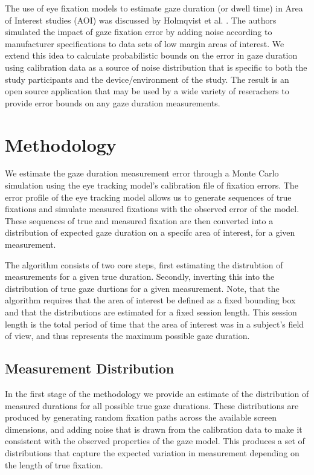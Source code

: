 \documentclass[12pt,a4paper]{article}
\numberwithin{equation}{section}
\begin{document}
The use of eye fixation models to estimate gaze duration (or dwell time) in Area of
Interest studies (AOI) was discussed by Holmqvist et al. \cite{Holmqvist2012}. The
authors simulated the impact of gaze fixation error by adding noise according to
manufacturer specifications to data sets of low margin areas of interest. We extend 
this idea to calculate probabilistic bounds on the error in gaze duration using
calibration data as a source of noise distribution that is specific to both the
study participants and the device/environment of the study. The result is an open
source application that may be used by a wide variety of reserachers to provide
error bounds on any gaze duration measurements.


\section{Methodology}

We estimate the gaze duration measurement error through a Monte Carlo simulation
using the eye tracking model's calibration file of fixation errors.
The error profile of the eye tracking model allows us to generate sequences of true
fixations and simulate measured fixations with the observed error of the model.
These sequences of true and measured fixation are then converted into a distribution
of expected gaze duration on a specifc area of interest, for a given measurement. 

The algorithm consists of two core steps, first estimating the distrubtion of measurements
for a given true duration. Secondly, inverting this into the distribution of true
gaze durtions for a given measurement. Note, that the algorithm requires that the area of
interest be defined as a fixed bounding box and that the distributions are estimated for
a fixed session length. This session length is the total period of time that the area of
interest was in a subject's field of view, and thus represents the maximum possible gaze
duration.

\subsection{Measurement Distribution}

In the first stage of the methodology we provide an estimate of the distribution of measured
durations for all possible true gaze durations. These distributions are produced by generating
random fixation paths across the available screen dimensions, and adding noise that is 
drawn from the calibration data to make it consistent with the observed properties of the gaze model.
This produces a set of distributions that capture the expected
variation in measurement depending on the length of true fixation.
\end{document}
